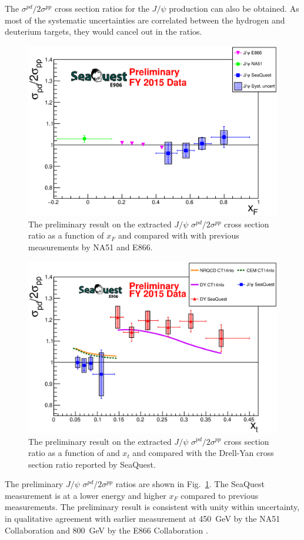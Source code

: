 \documentclass[10pt,a4paper,final]{article}
\begin{document}
The $\sigma^{pd}/2\sigma^{pp}$ cross section ratios for the $J/\psi$ production
can also be obtained. As most of the systematic uncertainties are correlated
between the hydrogen and deuterium targets, they would cancel out in the ratios.
\begin{figure}[h!]
	\centering
	\includegraphics[width=0.6\linewidth]{jPsi_all_noTheory_v2}
	\caption{The preliminary result on the extracted $J/\psi$ $\sigma^{pd}/2\sigma^{pp}$
		cross section ratio as a function of $x_F$ and compared with with previous 
		measurements by NA51 and E866.}
	\label{fig:csr}
\end{figure}
\begin{figure}[h!]
	\centering
	\includegraphics[width=0.6\linewidth]{jPsi_csr_x2_nature_NRQCD_CEM}
	\caption{The preliminary result on the extracted $J/\psi$ $\sigma^{pd}/2\sigma^{pp}$
		cross section ratio as a function of and $x_t$ and compared with the Drell-Yan cross
		section ratio reported by SeaQuest.}
	\label{fig:csr_xT}
\end{figure}
The preliminary $J/\psi$ $\sigma^{pd}/2\sigma^{pp}$ ratios are shown in
Fig.~\ref{fig:csr}. The SeaQuest measurement is at a lower energy and higher $x_F$
compared to previous measurements. The preliminary result is consistent with unity
within uncertainty, in qualitative agreement with earlier measurement at \SI{450}{\GeV}
by the NA51 Collaboration \cite{abreu1998} and \SI{800}{\GeV} by the E866 Collaboration
\cite{peng2003}.
\end{document}

